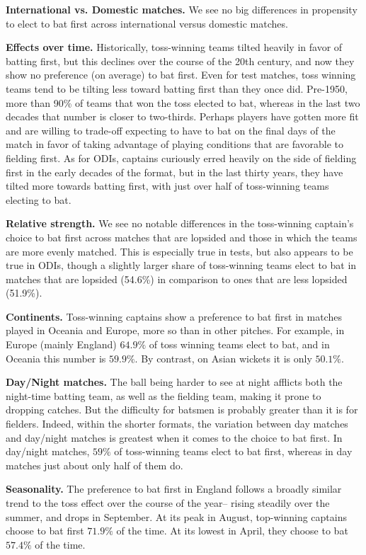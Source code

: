 \documentclass[11pt,  letterpaper]{article}
\begin{document}
\textbf{International vs. Domestic matches.} We see no big differences in propensity to elect to bat first across international versus domestic matches.

\textbf{Effects over time.} Historically, toss-winning teams tilted heavily in favor of batting first, but this declines over the course of the 20th century, and now they show no preference (on average) to  bat first. Even for test matches, toss winning teams tend to be tilting less toward batting first than they once did. Pre-1950, more than 90\% of teams that won the toss elected to bat, whereas in the last two decades that number is closer to two-thirds. Perhaps players have gotten more fit and are willing to trade-off expecting to have to bat on the final days of the match in favor of taking advantage of playing conditions that are favorable to fielding first. As for ODIs, captains curiously erred heavily on the side of fielding first in the early decades of the format, but in the last thirty years, they have tilted more towards batting first, with just over half of toss-winning teams electing to bat. 

\textbf{Relative strength.} We see no notable differences in the toss-winning captain's choice to bat first across matches that are lopsided and those in which the teams are more evenly matched. This is especially true in tests, but also appears to be true in ODIs, though a slightly larger share of toss-winning teams elect to bat in matches that are lopsided (54.6\%) in comparison to ones that are less lopsided (51.9\%).

\textbf{Continents.} Toss-winning captains show a preference to bat first in matches played in Oceania and Europe, more so than in other pitches. For example, in Europe (mainly England) $64.9\%$ of toss winning teams elect to bat, and in Oceania this number is $59.9\%$. By contrast, on Asian wickets it is only $50.1\%$. 

\textbf{Day/Night matches.} The ball being harder to see at night afflicts both the night-time batting team, as well as the fielding team, making it prone to dropping catches. But the difficulty for batsmen is probably greater than it is for fielders. Indeed, within the shorter formats, the variation between day matches and day/night matches is greatest when it comes to the choice to bat first. In day/night matches, $59\%$ of toss-winning teams elect to bat first, whereas in day matches just about only half of them do. 

\textbf{Seasonality.} The preference to bat first in England follows a broadly similar trend to the toss effect over the course of the year-- rising steadily over the summer, and drops in September. At its peak in August, top-winning captains choose to bat first $71.9\%$ of the time. At its lowest in April, they choose to bat $57.4\%$ of the time.
\end{document}
